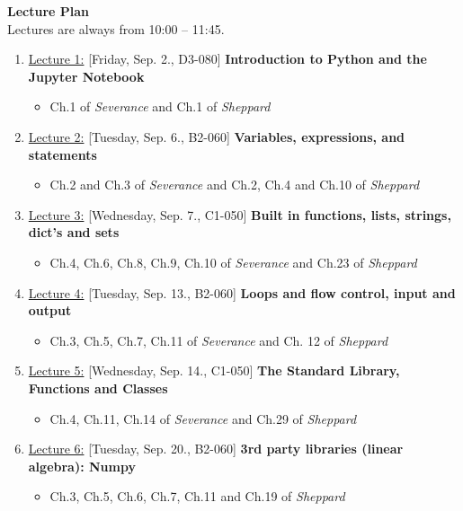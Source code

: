 \documentclass[12pt, a4paper]{article}
\begin{document}
\newpage
\noindent\textbf{\large Lecture Plan}\\
Lectures are always from 10:00 -- 11:45.
\begin{enumerate}
    \item[] \underline{Lecture 1:} [Friday, Sep. 2., D3-080] {\bf Introduction to Python and the Jupyter Notebook}
        \begin{itemize}
            \item Ch.1 of {\it Severance} and Ch.1 of {\it Sheppard}
        \end{itemize}
    \item[] \underline{Lecture 2:} [Tuesday, Sep. 6., B2-060] {\bf Variables, expressions, and statements}
        \begin{itemize}
            \item Ch.2 and Ch.3 of {\it Severance} and Ch.2, Ch.4 and Ch.10 of {\it Sheppard}
        \end{itemize}
    \item[] \underline{Lecture 3:} [Wednesday, Sep. 7., C1-050] {\bf Built in functions, lists, strings, dict's and sets}
        \begin{itemize}
            \item Ch.4, Ch.6, Ch.8, Ch.9, Ch.10 of {\it Severance} and Ch.23 of {\it Sheppard}
        \end{itemize}
    \item[] \underline{Lecture 4:} [Tuesday, Sep. 13., B2-060] {\bf Loops and flow control, input and output}
        \begin{itemize}
            \item Ch.3, Ch.5, Ch.7, Ch.11 of {\it Severance} and Ch. 12 of {\it Sheppard}
        \end{itemize}
    \item[] \underline{Lecture 5:} [Wednesday, Sep. 14., C1-050] {\bf The Standard Library, Functions and Classes}
        \begin{itemize}
            \item Ch.4, Ch.11, Ch.14 of {\it Severance} and Ch.29 of {\it Sheppard}
        \end{itemize}
    \item[] \underline{Lecture 6:} [Tuesday, Sep. 20., B2-060] {\bf 3rd party libraries (linear algebra): Numpy}
        \begin{itemize}
            \item Ch.3, Ch.5, Ch.6, Ch.7, Ch.11 and Ch.19 of {\it Sheppard}
        \end{itemize}

\end{enumerate}
\end{document}
